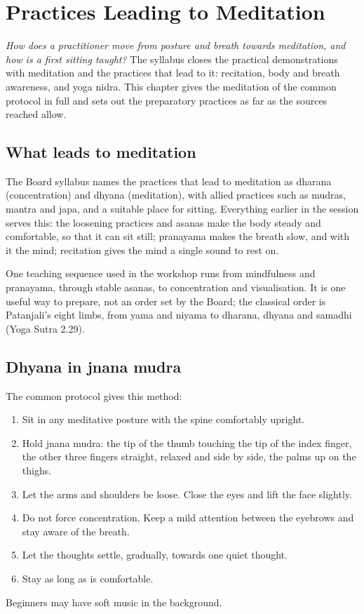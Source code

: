 \chapter{Practices Leading to Meditation}
\label{ch:meditation}

\emph{How does a practitioner move from posture and breath towards meditation, and how is a first sitting taught?}
The syllabus closes the practical demonstrations with meditation and the practices that lead to it: recitation, body and breath awareness, and yoga nidra. This chapter gives the meditation of the common protocol in full and sets out the preparatory practices as far as the sources reached allow.

\section{What leads to meditation}

The Board syllabus names the practices that lead to meditation as dharana (concentration) and dhyana (meditation), with allied practices such as mudras, mantra and japa, and a suitable place for sitting. Everything earlier in the session serves this: the loosening practices and asanas make the body steady and comfortable, so that it can sit still; pranayama makes the breath slow, and with it the mind; recitation gives the mind a single sound to rest on.

One teaching sequence used in the workshop runs from mindfulness and pranayama, through stable asanas, to concentration and visualisation. It is one useful way to prepare, not an order set by the Board; the classical order is Patanjali's eight limbs, from yama and niyama to dharana, dhyana and samadhi (Yoga Sutra 2.29).

\section{Dhyana in jnana mudra}

The common protocol gives this method:
\begin{enumerate}
\item Sit in any meditative posture with the spine comfortably upright.
\item Hold jnana mudra: the tip of the thumb touching the tip of the index finger, the other three fingers straight, relaxed and side by side, the palms up on the thighs.
\item Let the arms and shoulders be loose. Close the eyes and lift the face slightly.
\item Do not force concentration. Keep a mild attention between the eyebrows and stay aware of the breath.
\item Let the thoughts settle, gradually, towards one quiet thought.
\item Stay as long as is comfortable.
\end{enumerate}
Beginners may have soft music in the background.

